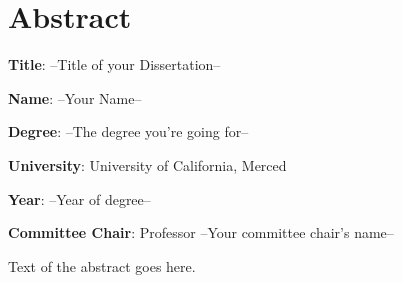 \chapter*{Abstract}
{}

\noindent \textbf{Title}: --Title of your Dissertation--

\noindent \textbf{Name}: --Your Name--

\noindent \textbf{Degree}: --The degree you're going for--

\noindent \textbf{University}: University of California, Merced

\noindent \textbf{Year}: --Year of degree--

\noindent \textbf{Committee Chair}: Professor --Your committee chair's name--



    


Text of the abstract goes here.